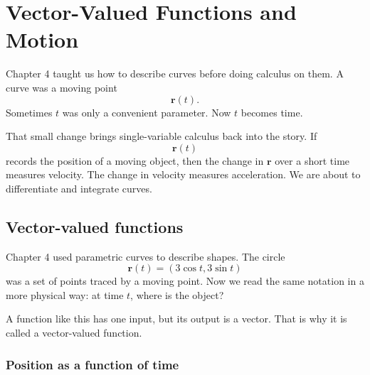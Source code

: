 
\chapter{Vector-Valued Functions and Motion}
\label{ch:5}

Chapter 4 taught us how to describe curves before doing calculus on them.  A curve was
a moving point
\[
    \mathbf r(t).
\]
Sometimes \(t\) was only a convenient parameter.  Now \(t\) becomes time.

That small change brings single-variable calculus back into the story.  If
\[
    \mathbf r(t)
\]
records the position of a moving object, then the change in \(\mathbf r\) over a short
time measures velocity.  The change in velocity measures acceleration.  We are about
to differentiate and integrate curves.

\section{Vector-valued functions}
\label{sec:5.1}

Chapter 4 used parametric curves to describe shapes.  The circle
\[
    \mathbf r(t)=(3\cos t,3\sin t)
\]
was a set of points traced by a moving point.  Now we read the same notation in a more
physical way: at time \(t\), where is the object?

A function like this has one input, but its output is a vector.  That is why it is called
a vector-valued function.

\subsection{Position as a function of time}

